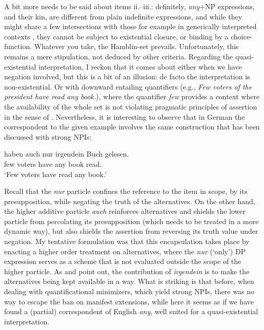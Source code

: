 \documentclass[output=paper,colorlinks,citecolor=brown,
]{langscibook}
\begin{document}
A bit more needs to be said about items ii.--iii.: definitely, \textit{any}+NP expressions, and their kin, are
different from plain indefinite expressions, and while they might share a few intersections with those for example in
generically interpreted contexts \citep[cf.][]{kadmonlandmann1993}, they cannot be subject to existential closure, or binding by a choice-function. Whatever you take, the Hamblin-set prevails. Unfortunately, this remains a mere stipulation,
not deduced by other criteria. Regarding the quasi-existential interpretation, I reckon that it comes about either when
we have negation involved, but this is a bit of an illusion: de facto the interpretation is non-existential. Or with downward entailing quantifiers
(e.g., \textit{Few voters of the president have read any book.}), where the quantifier \textit{few} provides a context where
the availability of the whole set is not violating pragmatic principles of assertion in the sense of
\citet{krifka1995}. Nevertheless, it is interesting to observe that in German the correspondent to the given example
involves the same construction that has been discussed with strong NPIs:

\ea
   {haben} {auch nur irgendein} {Buch} {gelesen.}\\
       {few voters} have any book read.\\
  \glt `Few voters have read any book.'
\z

Recall that the \textit{nur} particle confines the reference to the item in scope, by its presupposition, while negating
the truth of the alternatives. On the other hand, the higher additive particle \textit{auch} reinforces alternatives and shields the
lower particle from percolating its presupposition (which needs to be treated in a more dynamic way), but
also shields the assertion from reversing its truth value under negation. My tentative formulation was that this
encapsulation takes place by enacting a higher order treatment on alternatives, where the \textit{nur} (`only') DP
expression serves as a scheme that is not evaluated outside the scope of the higher particle. As
\citet{kratzershimo2002} and \citet{kratzer2005} point out, the contribution of \textit{irgendein} is to make the
alternatives being kept available in a way. What is striking is that before, when dealing with quantificational
minimizers, which yield strong NPIs, there was no way to escape the ban on manifest extensions, while here it seems
as if we have found a (partial) correspondent of English \textit{any}, well suited for a quasi-existential
interpretation.
\end{document}
